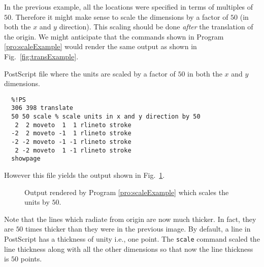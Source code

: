 In the previous example, all the locations were specified in terms of
multiples of $50$.  Therefore it might make sense to scale the
dimensions by a factor of $50$ (in both the $x$ and $y$ direction).
This scaling should be done {\em after} the translation of the origin.
We might anticipate that the commands shown in Program
\ref{pro:scaleExample} would render the same output as shown in Fig.\
\ref{fig:transExample}.
\begin{program}
PostScript file where the units are scaled by a factor of $50$ in both
the $x$ and $y$ dimensions.  \label{pro:scaleExample}
\codemiddle
\begin{verbatim}
  %!PS
  306 398 translate
  50 50 scale % scale units in x and y direction by 50
   2  2 moveto  1  1 rlineto stroke
  -2  2 moveto -1  1 rlineto stroke
  -2 -2 moveto -1 -1 rlineto stroke
   2 -2 moveto  1 -1 rlineto stroke
  showpage
\end{verbatim}
\end{program}
However this file yields the output shown in Fig.\ \ref{fig:transScale}.
\begin{figure}
  \begin{center}
  \end{center} \caption{Output rendered by Program
  \ref{pro:scaleExample} which scales the units by $50$.}
  \label{fig:transScale}
\end{figure}
Note that the lines which radiate from origin are now much thicker.
In fact, they are $50$ times thicker than they were in the previous
image.  By default, a line in PostScript has a thickness of unity
i.e., one point.  The {\tt scale} command scaled the line thickness
along with all the other dimensions so that now the line thickness is
$50$ points.

